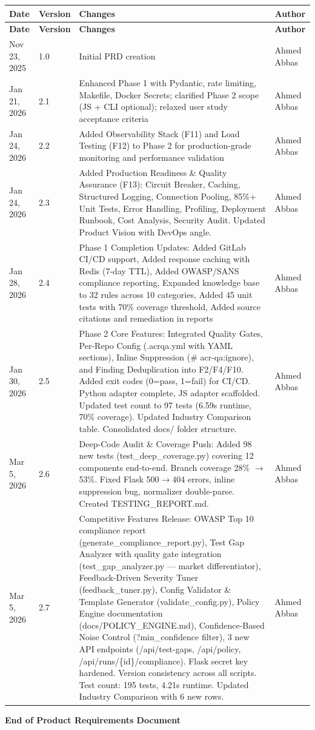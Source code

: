 \documentclass[11pt,a4paper]{article}
\begin{document}
\begin{longtable}{p{3cm}p{2cm}p{5cm}p{3cm}}
\toprule
\textbf{Date} & \textbf{Version} & \textbf{Changes} & \textbf{Author} \\
\midrule
\endfirsthead
\toprule
\textbf{Date} & \textbf{Version} & \textbf{Changes} & \textbf{Author} \\
\midrule
\endhead
Nov 23, 2025 & 1.0 & Initial PRD creation & Ahmed Abbas \\
\midrule
Jan 21, 2026 & 2.1 & Enhanced Phase 1 with Pydantic, rate limiting, Makefile, Docker Secrets; clarified Phase 2 scope (JS + CLI optional); relaxed user study acceptance criteria & Ahmed Abbas \\
\midrule
Jan 24, 2026 & 2.2 & Added Observability Stack (F11) and Load Testing (F12) to Phase 2 for production-grade monitoring and performance validation & Ahmed Abbas \\
\midrule
Jan 24, 2026 & 2.3 & Added Production Readiness \& Quality Assurance (F13): Circuit Breaker, Caching, Structured Logging, Connection Pooling, 85\%+ Unit Tests, Error Handling, Profiling, Deployment Runbook, Cost Analysis, Security Audit. Updated Product Vision with DevOps angle. & Ahmed Abbas \\
\midrule
Jan 28, 2026 & 2.4 & Phase 1 Completion Updates: Added GitLab CI/CD support, Added response caching with Redis (7-day TTL), Added OWASP/SANS compliance reporting, Expanded knowledge base to 32 rules across 10 categories, Added 45 unit tests with 70\% coverage threshold, Added source citations and remediation in reports & Ahmed Abbas \\
\midrule
Jan 30, 2026 & 2.5 & Phase 2 Core Features: Integrated Quality Gates, Per-Repo Config (.acrqa.yml with YAML sections), Inline Suppression (\# acr-qa:ignore), and Finding Deduplication into F2/F4/F10. Added exit codes (0=pass, 1=fail) for CI/CD. Python adapter complete, JS adapter scaffolded. Updated test count to 97 tests (6.59s runtime, 70\% coverage). Updated Industry Comparison table. Consolidated docs/ folder structure. & Ahmed Abbas \\
\midrule
Mar 5, 2026 & 2.6 & Deep-Code Audit \& Coverage Push: Added 98 new tests (test\_deep\_coverage.py) covering 12 components end-to-end. Branch coverage 28\% $\rightarrow$ 53\%. Fixed Flask 500$\rightarrow$404 errors, inline suppression bug, normalizer double-parse. Created TESTING\_REPORT.md. & Ahmed Abbas \\
\midrule
Mar 5, 2026 & 2.7 & Competitive Features Release: OWASP Top 10 compliance report (generate\_compliance\_report.py), Test Gap Analyzer with quality gate integration (test\_gap\_analyzer.py --- market differentiator), Feedback-Driven Severity Tuner (feedback\_tuner.py), Config Validator \& Template Generator (validate\_config.py), Policy Engine documentation (docs/POLICY\_ENGINE.md), Confidence-Based Noise Control (?min\_confidence filter), 3 new API endpoints (/api/test-gaps, /api/policy, /api/runs/\{id\}/compliance). Flask secret key hardened. Version consistency across all scripts. Test count: 195 tests, 4.21s runtime. Updated Industry Comparison with 6 new rows. & Ahmed Abbas \\
\bottomrule
\end{longtable}

\vspace{1cm}
\begin{center}
\textbf{End of Product Requirements Document}
\end{center}
\end{document}
